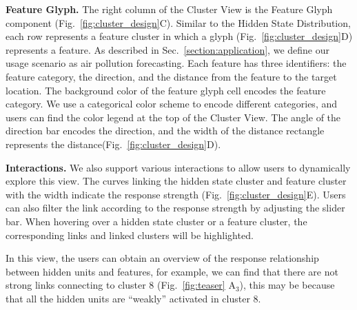 \textbf{Feature Glyph.}
The right column of the Cluster View is the Feature Glyph component (Fig.~\ref{fig:cluster_design}C).
Similar to the Hidden State Distribution, each row represents a feature cluster in which a glyph (Fig.~\ref{fig:cluster_design}D) represents a feature.
As described in Sec.~\ref{section:application}, we define our usage scenario as air pollution forecasting.
Each feature has three identifiers: the feature category, the direction, and the distance from the feature to the target location.
The background color of the feature glyph cell encodes the feature category.
We use a categorical color scheme to encode different categories, and users can find the color legend at the top of the Cluster View.
The angle of the direction bar encodes the direction, and the width of the distance rectangle represents the distance(Fig.~\ref{fig:cluster_design}D).

\textbf{Interactions.}
We also support various interactions to allow users to dynamically explore this view.
The curves linking the hidden state cluster and feature cluster with the width indicate the response strength (Fig.~\ref{fig:cluster_design}E). Users can also filter the link according to the response strength by adjusting the slider bar. 
When hovering over a hidden state cluster or a feature cluster, the corresponding links and linked clusters will be highlighted.

In this view, the users can obtain an overview of the response relationship between hidden units and features, for example, we can find that there are not strong links connecting to cluster 8 (Fig.~\ref{fig:teaser} A$_3$), this may be because that all the hidden units are ``weakly'' activated in cluster 8.
